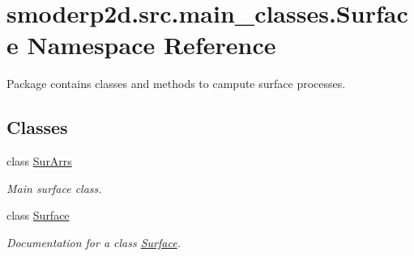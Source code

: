\hypertarget{namespacesmoderp2d_1_1src_1_1main__classes_1_1Surface}{\section{smoderp2d.\-src.\-main\-\_\-classes.\-Surface Namespace Reference}
\label{namespacesmoderp2d_1_1src_1_1main__classes_1_1Surface}
}


Package contains classes and methods to campute surface processes.  


\subsection*{Classes}
\begin{DoxyCompactItemize}
\item 
class \hyperlink{classsmoderp2d_1_1src_1_1main__classes_1_1Surface_1_1SurArrs}{Sur\-Arrs}
\begin{DoxyCompactList}\small\item\em Main surface class. \end{DoxyCompactList}\item 
class \hyperlink{classsmoderp2d_1_1src_1_1main__classes_1_1Surface_1_1Surface}{Surface}
\begin{DoxyCompactList}\small\item\em Documentation for a class \hyperlink{classsmoderp2d_1_1src_1_1main__classes_1_1Surface_1_1Surface}{Surface}. \end{DoxyCompactList}\end{DoxyCompactItemize}
